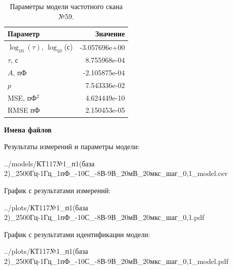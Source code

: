\begin{table}[!ht]
    \centering
    \caption{Параметры модели частотного скана №59.}
    \begin{tabular}{|l|r|}
        \hline
        Параметр                                       & Значение                  \\ \hline
        $\log_{10}(\tau)$, $\log_{10}$(с)              & -3.057696e+00             \\ \hline
        $\tau$, с                                      & 8.755968e-04              \\ \hline
        $A$, пФ                                        & -2.105875e-04             \\ \hline
        $p$                                            & 7.543336e-02              \\ \hline
        MSE, пФ$^2$                                    & 4.624449e-10              \\ \hline
        RMSE пФ                                        & 2.150453e-05              \\ \hline
    \end{tabular}
    \label{table:frequency_scan_model_59}
\end{table}

\textbf{Имена файлов}

Результаты измерений и параметры модели:

\scriptsize../models/КТ117№1\_п1(база 2)\_2500Гц-1Гц\_1пФ\_-10С\_-8В-9В\_20мВ\_20мкс\_шаг\_0,1\_model.csv
\normalsize

График с результатами измерений:

\scriptsize../plots/КТ117№1\_п1(база 2)\_2500Гц-1Гц\_1пФ\_-10С\_-8В-9В\_20мВ\_20мкс\_шаг\_0,1.pdf
\normalsize

График с результатами идентификации модели:

\scriptsize../plots/КТ117№1\_п1(база 2)\_2500Гц-1Гц\_1пФ\_-10С\_-8В-9В\_20мВ\_20мкс\_шаг\_0,1\_model.pdf
\normalsize

